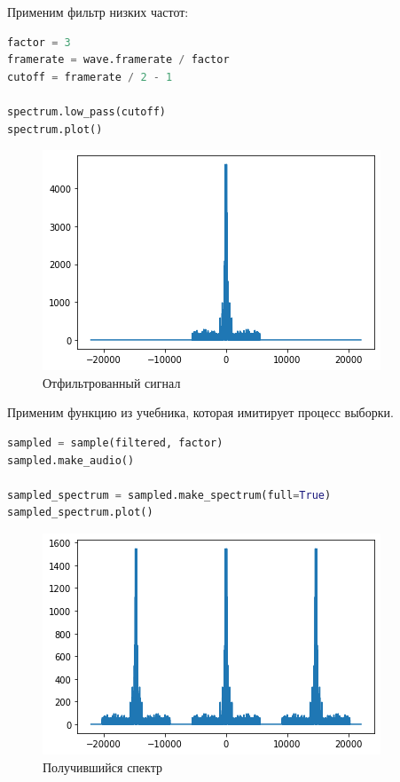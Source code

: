 Применим фильтр низких частот:

\begin{lstlisting}[language=Python]
factor = 3
framerate = wave.framerate / factor
cutoff = framerate / 2 - 1

spectrum.low_pass(cutoff)
spectrum.plot()
\end{lstlisting}
\begin{figure}[H]
	\begin{center}
		\includegraphics[scale=1]{fig/lab11/lab11_3.png}
		\caption{Отфильтрованный сигнал}
	\end{center}
\end{figure}

Применим функцию из учебника, которая имитирует процесс выборки.


\begin{lstlisting}[language=Python]
sampled = sample(filtered, factor)
sampled.make_audio()

sampled_spectrum = sampled.make_spectrum(full=True)
sampled_spectrum.plot()
\end{lstlisting}
\begin{figure}[H]
	\begin{center}
		\includegraphics[scale=1]{fig/lab11/lab11_4.png}
		\caption{Получившийся спектр}
	\end{center}
\end{figure}


